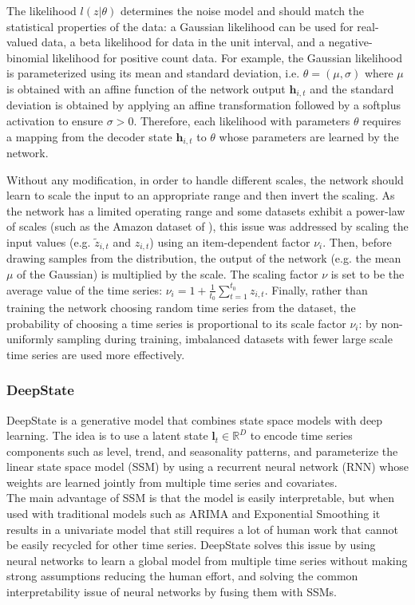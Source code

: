 \documentclass[a4paper, 12pt]{article} %
\begin{document}
	The likelihood $l(z | \theta)$ determines the noise model and should match the statistical properties of the data: a Gaussian likelihood can be used for real-valued data, a beta likelihood for data in the unit interval, and a negative-binomial likelihood for positive count data. For example, the Gaussian likelihood is parameterized using its mean and standard deviation, i.e. $\theta = (\mu, \sigma)$ where $\mu$ is obtained with an affine function of the network output $\pmb{h}_{i,t}$ and the standard deviation is obtained by applying an affine transformation followed by a softplus activation to ensure $\sigma > 0$.
	Therefore, each likelihood with parameters $\theta$ requires a mapping from the decoder state $\pmb{h}_{i,t}$ to $\theta$ whose parameters are learned by the network.
	
	Without any modification, in order to handle different scales, the network should learn to scale the input to an appropriate range and then invert the scaling. As the network has a limited operating range and some datasets exhibit a power-law of scales (such as the Amazon dataset of \cite{DeepAR}), this issue was addressed by scaling the input values (e.g. $\tilde{z}_{i, t}$ and $z_{i,t}$) using an item-dependent factor $\nu_i$. Then, before drawing samples from the distribution, the output of the network (e.g. the mean $\mu$ of the Gaussian) is multiplied by the scale. The scaling factor $\nu$ is set to be the average value of the time series: $\nu_i = 1 + \frac{1}{t_0} \sum_{t=1}^{t_0} z_{i,t}$. Finally, rather than training the network choosing random time series from the dataset, the probability of choosing a time series is proportional to its scale factor $\nu_i$: by non-uniformly sampling during training, imbalanced datasets with fewer large scale time series are used more effectively.
	
	
	\subsubsection{DeepState } \label{sssec:deepstate}
	DeepState \cite{DeepState} is a generative model that combines state space models \cite{ExponentialSmoothingStateSpace} with deep learning. The idea is to use a latent state $\pmb{l}_t \in \mathbb{R}^D$ to encode time series components such as level, trend, and seasonality patterns, and parameterize the linear state space model (SSM) by using a recurrent neural network (RNN) whose weights are learned jointly from multiple time series and covariates. \\
	The main advantage of SSM is that the model is easily interpretable, but when used with traditional models such as ARIMA and Exponential Smoothing it results in a univariate model that still requires a lot of human work that cannot be easily recycled for other time series.
	DeepState solves this issue by using neural networks to learn a global model from multiple time series without making strong assumptions reducing the human effort, and solving the common interpretability issue of neural networks by fusing them with SSMs.
	
\end{document}
